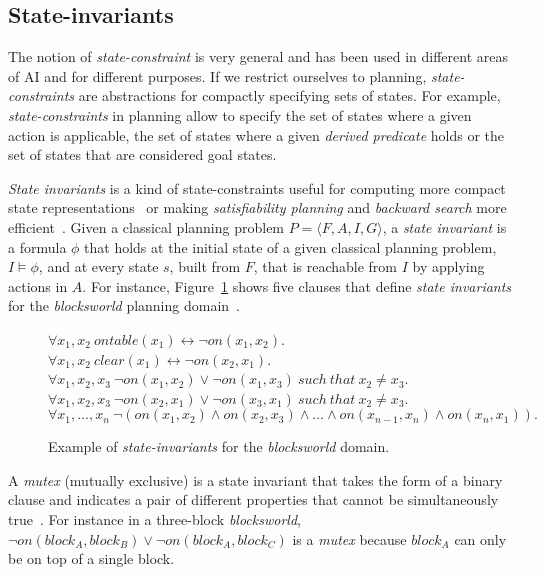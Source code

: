 \documentclass{article}
\newcommand{\tup}[1]{{\langle #1 \rangle}}
\begin{document}
\subsection{State-invariants}
The notion of {\em state-constraint} is very general and has been used in different areas of AI and for different purposes.  If we restrict ourselves to planning, {\em state-constraints} are abstractions for compactly specifying sets of states. For example, {\em state-constraints} in planning allow to specify the set of states where a given action is applicable, the set of states where a given {\em derived predicate} holds or the set of states that are considered goal states.

{\em State invariants} is a kind of state-constraints useful for computing more compact state representations~\cite{helmert2009concise} or making {\em satisfiability planning} and {\em backward search} more efficient~\cite{rintanen2014madagascar,alcazar2015reminder}. Given a classical planning problem $P=\tup{F,A,I,G}$, a {\em state invariant} is a formula $\phi$ that holds at the initial state of a given classical planning problem, $I\models \phi$, and at every state $s$, built from $F$, that is reachable from $I$ by applying actions in $A$. For instance, Figure~\ref{fig:strongest-invariant} shows five clauses that define {\em state invariants} for the {\em blocksworld} planning domain~\cite{slaney2001blocks}. 

\begin{figure}[hbt!]
  \begin{footnotesize}
$\forall x_1,x_2\ ontable(x_1)\leftrightarrow\neg on(x_1,x_2)$.\\
$\forall x_1,x_2\ clear(x_1)\leftrightarrow\neg on(x_2,x_1)$.\\
$\forall x_1,x_2,x_3\ \neg on(x_1,x_2)\vee\neg on(x_1,x_3)\ such\ that\ x_2\neq x_3$.\\
$\forall x_1,x_2,x_3\ \neg on(x_2,x_1)\vee\neg on(x_3,x_1)\ such\ that\ x_2\neq x_3$.\\
$\forall x_1,\ldots,x_n\ \neg(on(x_1,x_2)\wedge on(x_2,x_3)\wedge\ldots\wedge on(x_{n-1},x_n)\wedge on(x_n,x_1)).$
\end{footnotesize}
 \caption{\small Example of {\em state-invariants} for the {\em blocksworld} domain.}
\label{fig:strongest-invariant}
\end{figure}

A {\em mutex} (mutually exclusive) is a state invariant that takes the form of a binary clause and indicates a pair of different properties that cannot be simultaneously true~\cite{kautz:mutex:IJCAI1999}. For instance in a three-block {\em blocksworld}, $\neg on(block_A,block_B)\vee \neg on(block_A,block_C)$ is a {\em mutex} because $block_A$ can only be on top of a single block.
\end{document}
